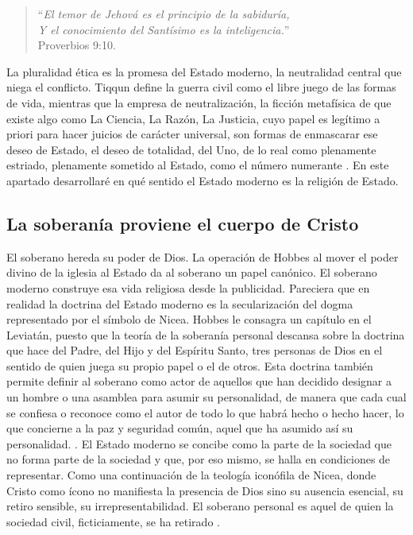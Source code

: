 \begin{quote}
  \enquote{\emph{El temor de Jehová es el principio de la sabiduría,\\ 
  Y el conocimiento del Santísimo es la inteligencia.}}\\
  Proverbios 9:10.
\end{quote}

La pluralidad ética es la promesa del Estado moderno, la neutralidad central que niega el conflicto. Tiqqun define la guerra civil como el libre juego de las formas de vida, mientras que la empresa de neutralización, la ficción metafísica de que existe algo como La Ciencia, La Razón, La Justicia, cuyo papel es legítimo a priori para hacer juicios de carácter universal, son formas de enmascarar ese deseo de Estado, el deseo de totalidad, del Uno, de lo real como plenamente estriado, plenamente sometido al Estado, como el número numerante \autocite{tiqqunIntroduccionGuerraCivil2008}. En este apartado desarrollaré en qué sentido el Estado moderno es la religión de Estado.

\subsection{La soberanía proviene el cuerpo de Cristo}
\label{sub:la-soberanía-proviene-el-cuerpo-de-cristo}

El soberano hereda su poder de Dios. La operación de Hobbes al mover el poder divino de la iglesia al Estado da al soberano un papel canónico. El soberano moderno construye esa vida religiosa desde la publicidad. Pareciera que en realidad la doctrina del Estado moderno es la secularización del dogma representado por el símbolo de Nicea. Hobbes le consagra un capítulo en el Leviatán, puesto que la teoría de la soberanía personal descansa sobre la doctrina que hace del Padre, del Hijo y del Espíritu Santo, tres personas de Dios en el sentido de quien juega su propio papel o el de otros. Esta doctrina también permite definir al soberano como actor de aquellos que han decidido designar a un hombre o una asamblea para asumir su personalidad, de manera que cada cual se confiesa o reconoce como el autor de todo lo que habrá hecho o hecho hacer, lo que concierne a la paz y seguridad común, aquel que ha asumido así su personalidad. \autocite[pp. 59-97]{tiqqunIntroduccionGuerraCivil2008}. El Estado moderno se concibe como la parte de la sociedad que no forma parte de la sociedad y que, por eso mismo, se halla en condiciones de representar. Como una continuación de la teología iconófila de Nicea, donde Cristo como ícono no manifiesta la presencia de Dios sino su ausencia esencial, su retiro sensible, su irrepresentabilidad. El soberano personal es aquel de quien la sociedad civil, ficticiamente, se ha retirado \autocite[p. 63]{tiqqunIntroduccionGuerraCivil2008}.

